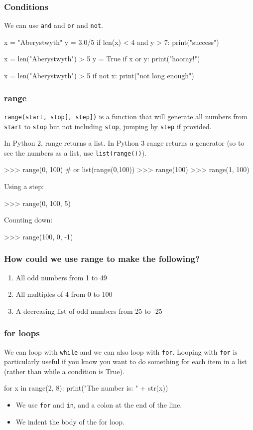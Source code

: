 \documentclass{beamer}
\begin{document}
\begin{frame}[fragile]
\frametitle{Conditions}
We can use {\tt and} and {\tt or} and {\tt not}.

\begin{code}
x = "Aberystwyth"
y = 3.0/5
if len(x) < 4 and y > 7:
   print("success")

x = len("Aberystwyth") > 5
y = True
if x or y:
   print("hooray!")

x = len("Aberystwyth") > 5
if not x:
   print("not long enough")
\end{code}
\end{frame}


\begin{frame}[fragile]
\frametitle{range}
\texttt{range(start, stop[, step])} is a function that will generate all
numbers from \texttt{start} to \texttt{stop} but not including
\texttt{stop}, jumping by \texttt{step} if provided.
 
\bigskip

In Python 2, range returns a list. In Python 3 range returns a
generator (so to see the numbers as a list, use \texttt{list(range())}).

\begin{code}
>>> range(0, 100)  # or list(range(0,100))
>>> range(100)
>>> range(1, 100)
\end{code}
Using a step:
\begin{code}
>>> range(0, 100, 5)
\end{code}
Counting down:
\begin{code}
>>> range(100, 0, -1)
\end{code}
\end{frame}

\begin{frame}
\frametitle{How could we use range to make the following?}
\begin{enumerate}
\item All odd numbers from 1 to 49
\item All multiples of 4 from 0 to 100
\item A decreasing list of odd numbers from 25 to -25
\end{enumerate}
\end{frame}

\begin{frame}[fragile]
\frametitle{for loops}
We can loop with \texttt{while} and we can also loop with \texttt{for}.
Looping with \texttt{for} is particularly useful if you know you
want to do something for each item in a list (rather than
while a condition is True).
\begin{code}
for x in range(2, 8):
   print("The number is: " + str(x))
\end{code}
\begin{itemize}
\item We use \texttt{for} and \texttt{in}, and a colon at the end of the line.
\item We indent the body of the for loop.
\end{itemize}
\end{frame}
\end{document}
